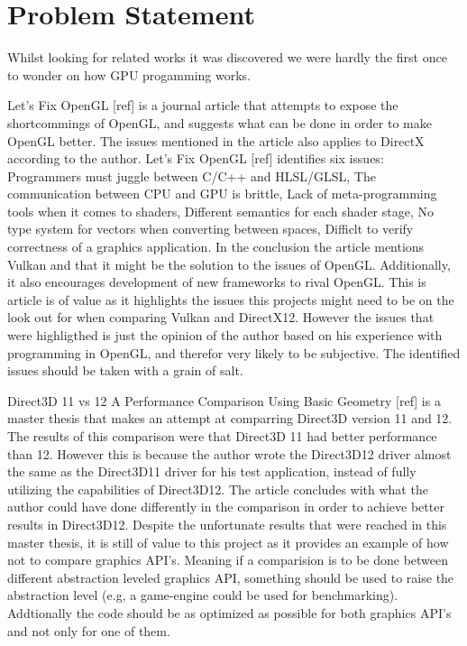 \section{Problem Statement}\label{sec:problem_statement}
\begin{sectionmeta}
Whilst looking for related works it was discovered we were hardly the first once to wonder on how GPU progamming works.

Let's Fix OpenGL [ref] is a journal article that attempts to expose the shortcommings of OpenGL, and suggests what can be done in order to make OpenGL better. 
The issues mentioned in the article also applies to DirectX according to the author. 
Let's Fix OpenGL [ref] identifies six issues: 
Programmers must juggle between C/C++ and HLSL/GLSL, 
The communication between CPU and GPU is brittle,
Lack of meta-programming tools when it comes to shaders,
Different semantics for each shader stage,
No type system for vectors when converting between spaces,
Difficlt to verify correctness of a graphics application.
In the conclusion the article mentions Vulkan and that it might be the solution to the issues of OpenGL. Additionally, it also encourages development of new frameworks to rival OpenGL.
This is article is of value as it highlights the issues this projects might need to be on the look out for when comparing Vulkan and DirectX12. 
However the issues that were highligthed is just the opinion of the author based on his experience with programming in OpenGL, and therefor very likely to be subjective. 
The identified issues should be taken with a grain of salt.

Direct3D 11 vs 12 A Performance Comparison Using Basic Geometry [ref] is a master thesis that makes an attempt at comparring Direct3D version 11 and 12. 
The results of this comparison were that Direct3D 11 had better performance than 12. 
However this is because the author wrote the Direct3D12 driver almost the same as the Direct3D11 driver for his test application, instead of fully utilizing the capabilities of Direct3D12. 
The article concludes with what the author could have done differently in the comparison in order to achieve better results in Direct3D12.
Despite the unfortunate results that were reached in this master thesis, it is still of value to this project as it provides an example of how not to compare graphics API's. 
Meaning if a comparision is to be done between different abstraction leveled graphics API, something should be used to raise the abstraction level  (e.g, a game-engine could be used for benchmarking). 
Addtionally the code should be as optimized as possible for both graphics API's and not only for one of them.


\end{sectionmeta}
